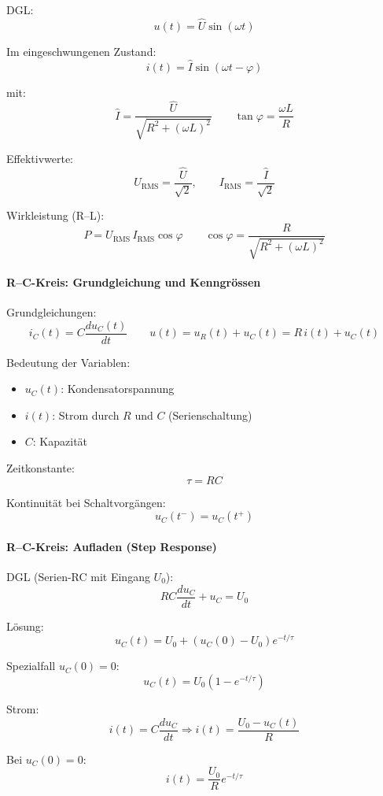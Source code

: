 DGL:
\[
u(t)=\hat U\sin(\omega t)
\]

Im eingeschwungenen Zustand:
\[
\boxed{i(t)=\hat I\sin(\omega t-\varphi)}
\]

mit:
\[
\boxed{\hat I=\frac{\hat U}{\sqrt{R^2+(\omega L)^2}}}
\qquad
\boxed{\tan\varphi=\frac{\omega L}{R}}
\]

Effektivwerte:
\[
\boxed{U_{\mathrm{RMS}}=\frac{\hat U}{\sqrt{2}}},
\qquad
\boxed{I_{\mathrm{RMS}}=\frac{\hat I}{\sqrt{2}}}
\]

Wirkleistung (R--L):
\[
\boxed{P=U_{\mathrm{RMS}}\,I_{\mathrm{RMS}}\cos\varphi}
\qquad
\boxed{\cos\varphi=\frac{R}{\sqrt{R^2+(\omega L)^2}}}
\]


\paragraph{R--C-Kreis: Grundgleichung und Kenngrössen}

Grundgleichungen:
\[
\boxed{i_C(t)=C\frac{du_C(t)}{dt}}
\qquad
\boxed{u(t)=u_R(t)+u_C(t)=R\,i(t)+u_C(t)}
\]

Bedeutung der Variablen:
\begin{itemize}
\item $u_C(t)$: Kondensatorspannung
\item $i(t)$: Strom durch $R$ und $C$ (Serienschaltung)
\item $C$: Kapazität
\end{itemize}

Zeitkonstante:
\[
\boxed{\tau=RC}
\]

Kontinuität bei Schaltvorgängen:
\[
\boxed{u_C(t^-)=u_C(t^+)}
\]


\paragraph{R--C-Kreis: Aufladen (Step Response)}

DGL (Serien-RC mit Eingang $U_0$):
\[
RC\frac{du_C}{dt}+u_C=U_0
\]

Lösung:
\[
\boxed{
u_C(t)=U_0+\left(u_C(0)-U_0\right)e^{-t/\tau}
}
\]

Spezialfall $u_C(0)=0$:
\[
\boxed{u_C(t)=U_0\left(1-e^{-t/\tau}\right)}
\]

Strom:
\[
i(t)=C\frac{du_C}{dt}
\Rightarrow
\boxed{i(t)=\frac{U_0-u_C(t)}{R}}
\]

Bei $u_C(0)=0$:
\[
\boxed{i(t)=\frac{U_0}{R}e^{-t/\tau}}
\]

